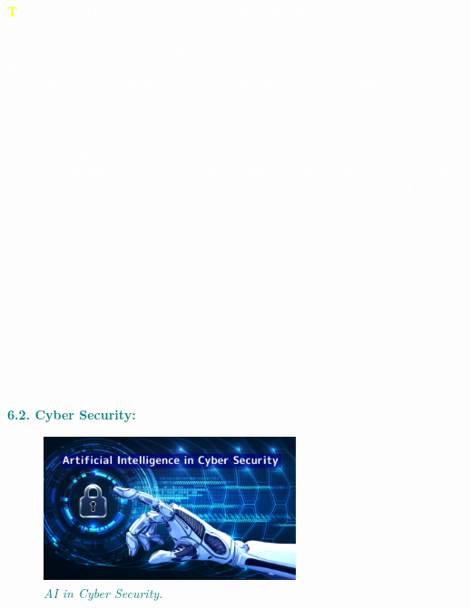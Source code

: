\documentclass[12pt]{article}
\begin{document}
\textcolor{white}{\textbf{\textcolor{yellow}{\huge T}}he scope of AI in science is the largest. Recently ‘Eve’ was in the news for discovering that an ingredient found commonly in toothpaste, is capable of curing Malaria. Here the subject in appreciation ‘Eve’ is not a human scientist, rather a Robot created by a team of scientists at the Universities of Manchester, Aberystwyth, and Cambridge.
Eve’s example hints at the possibility of AI playing a bigger role in science in future, not just merely for augmentation. AI will be able to create science, not merely do science as evidenced by the Robot Scientist, Eve. Automation using AI for drug discovery is a field that is rapidly growing, mainly because machines work faster than humans. AI is also being applied in related areas such as synthetic biology for the manufacture and rapid design of microorganisms for industrial uses. Taking all this in stride, AI is sure to transform science as we know it.}\\\\\\\\\\\\\\\\\\\\\\

\begin{large}
\textbf{\textcolor{teal}{6.2. Cyber Security:}}\\
\end{large}

\begin{figure}
\centering
\includegraphics[width=2.9in]{rgOcI1557207528-770x439_c}

\caption{\textit{\textcolor{teal}{AI in Cyber Security.}}}
\end{figure}
\end{document}
